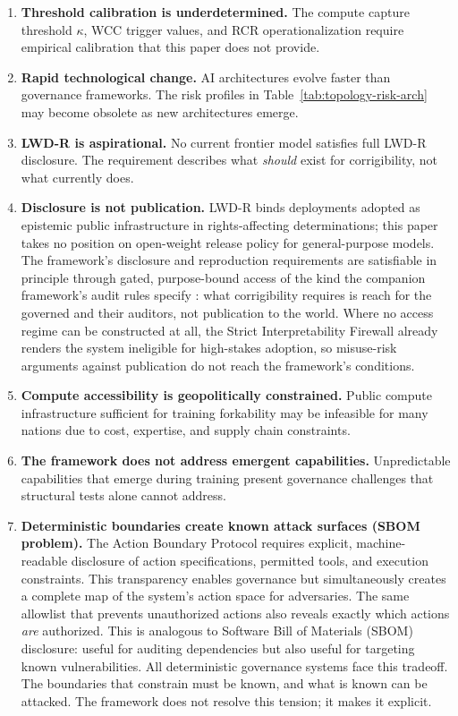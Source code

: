 \documentclass{article}
\theoremstyle{definition}
\begin{document}
\begin{enumerate}
    \item \textbf{Threshold calibration is underdetermined.} The compute capture threshold $\kappa$, WCC trigger values, and RCR operationalization require empirical calibration that this paper does not provide.

    \item \textbf{Rapid technological change.} AI architectures evolve faster than governance frameworks. The risk profiles in Table~\ref{tab:topology-risk-arch} may become obsolete as new architectures emerge.

    \item \textbf{LWD-R is aspirational.} No current frontier model satisfies full LWD-R disclosure. The requirement describes what \textit{should} exist for corrigibility, not what currently does.
    \item \textbf{Disclosure is not publication.} LWD-R binds deployments adopted as epistemic public infrastructure in rights-affecting determinations; this paper takes no position on open-weight release policy for general-purpose models. The framework's disclosure and reproduction requirements are satisfiable in principle through gated, purpose-bound access of the kind the companion framework's audit rules specify \citep{aravind2026dpi}: what corrigibility requires is reach for the governed and their auditors, not publication to the world. Where no access regime can be constructed at all, the Strict Interpretability Firewall already renders the system ineligible for high-stakes adoption, so misuse-risk arguments against publication do not reach the framework's conditions.

    \item \textbf{Compute accessibility is geopolitically constrained.} Public compute infrastructure sufficient for training forkability may be infeasible for many nations due to cost, expertise, and supply chain constraints.

    \item \textbf{The framework does not address emergent capabilities.} Unpredictable capabilities that emerge during training present governance challenges that structural tests alone cannot address.

    \item \textbf{Deterministic boundaries create known attack surfaces (SBOM problem).} The Action Boundary Protocol requires explicit, machine-readable disclosure of action specifications, permitted tools, and execution constraints. This transparency enables governance but simultaneously creates a complete map of the system's action space for adversaries. The same allowlist that prevents unauthorized actions also reveals exactly which actions \textit{are} authorized. This is analogous to Software Bill of Materials (SBOM) disclosure: useful for auditing dependencies but also useful for targeting known vulnerabilities. All deterministic governance systems face this tradeoff. The boundaries that constrain must be known, and what is known can be attacked. The framework does not resolve this tension; it makes it explicit.
\end{enumerate}
\end{document}

